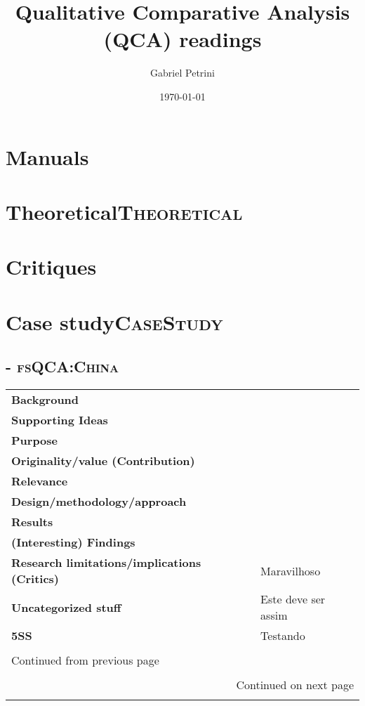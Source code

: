 \documentclass[11pt]{article}
\author{Gabriel Petrini}
\date{\today}
\title{Qualitative Comparative Analysis (QCA) readings}
\begin{document}
\maketitle
\tableofcontents


\section{Manuals}
\label{sec:org5b26a90}

\section{Theoretical\hfill{}\textsc{Theoretical}}
\label{sec:orgdfa2539}
\section{Critiques}
\label{sec:org3a83884}
\section{Case study\hfill{}\textsc{CaseStudy}}
\label{sec:orgb6dfa17}

\subsection{\textcite{lili_dynamic_2020} - \hfill{}\textsc{fsQCA:China}}
\label{sec:org5ea251a}

\begin{longtable}{l|p{}}
\hline
\hline
\textbf{Background} & \\
\textbf{Supporting Ideas} & \\
\textbf{Purpose} & \\
\textbf{Originality/value (Contribution)} & \\
\textbf{Relevance} & \\
\textbf{Design/methodology/approach} & \\
\textbf{Results} & \\
\textbf{(Interesting) Findings} & \\
\textbf{Research limitations/implications (Critics)} & Maravilhoso\\
\textbf{Uncategorized stuff} & Este deve ser assim\\
\textbf{5SS} & Testando\\
 & \\
\hline
\endfirsthead
\multicolumn{2}{l}{Continued from previous page} \\

 &  \\

\hline
\endhead
\hline\multicolumn{2}{r}{Continued on next page} \\
\endfoot
\endlastfoot
\hline
\hline
\end{longtable}
\end{document}
